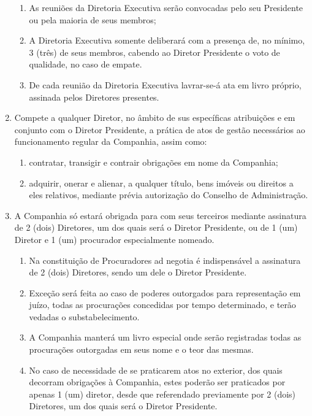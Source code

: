 \documentclass[a4paper,11pt]{report}
\begin{document}
\begin{enumerate}[resume, label=Art. \arabic*]
    \begin{enumerate}[label= \S \arabic*]
    \item As reuniões da Diretoria Executiva serão convocadas pelo seu Presidente ou pela maioria de seus membros;
    \item A Diretoria Executiva somente deliberará com a presença de, no mínimo, 3 (três) de seus membros, cabendo ao Diretor Presidente o voto de qualidade, no caso de empate.
    \item De cada reunião da Diretoria Executiva lavrar-se-á ata em livro próprio, assinada pelos Diretores presentes. 
    \end{enumerate}

\item Compete a qualquer Diretor, no âmbito de sus específicas atribuições e em conjunto com o Diretor Presidente, a prática de atos de gestão necessários ao funcionamento regular da Companhia, assim como:
        \begin{enumerate}[label=\roman*.]
        \item contratar, transigir e contrair obrigações em nome da Companhia;
        \item adquirir, onerar e alienar, a qualquer título, bens imóveis ou direitos a eles relativos, mediante prévia autorização do Conselho de Administração.
        \end{enumerate}

\item A Companhia só estará obrigada para com seus terceiros mediante assinatura de 2 (dois) Diretores, um dos quais será o Diretor Presidente, ou de 1 (um) Diretor e 1 (um) procurador especialmente nomeado.
        \begin{enumerate}[label= \S \arabic*]
        \item Na constituição de Procuradores ad negotia é indispensável a assinatura de 2 (dois) Diretores, sendo um dele o Diretor Presidente.
        \item Exceção será feita ao caso de poderes outorgados para representação em juízo, todas as procurações concedidas por tempo determinado, e terão vedadas o substabelecimento.
        \item A Companhia manterá um livro especial onde serão registradas todas as procurações outorgadas em seus nome e o teor das mesmas.
        \item No caso de necessidade de se praticarem atos no exterior, dos quais decorram obrigações à Companhia, estes poderão ser praticados por apenas 1 (um) diretor, desde que referendado previamente por 2 (dois) Diretores, um dos quais será o Diretor Presidente.
        \end{enumerate}


\end{enumerate}
\end{document}
